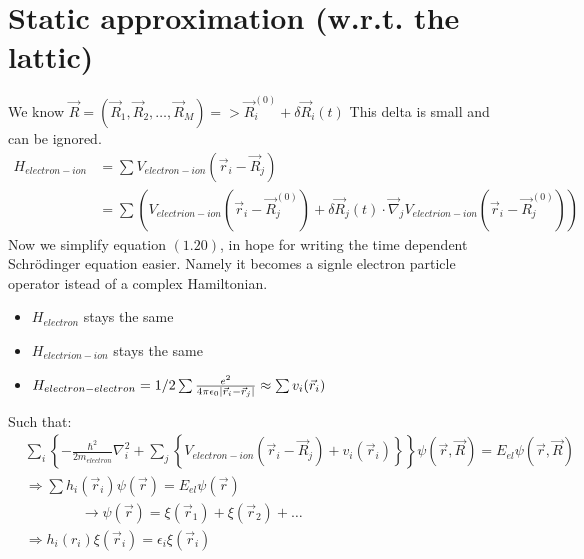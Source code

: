 \documentclass{report}
\begin{document}
\section{Static approximation (w.r.t. the lattic)}
We know $\vec{R} = (\vec{R}_1, \vec{R}_2, \dots, \vec{R}_M) => \vec{R}^{(0)}_i + \delta\vec{R}_i(t)$ This delta is small and can be ignored.
\begin{align}
	H_{electron - ion} & = \sum{V_{electron - ion}(\vec{r}_i - \vec{R}_j)} \\
	& = \sum{(V_{electrion - ion}(\vec{r}_i - \vec{R}^{(0)}_j) + \delta\vec{R}_j(t) \cdot \vec{\nabla}_j V_{electrion - ion}(\vec{r}_i - \vec{R}^{(0)}_j))}
\end{align}
Now we simplify equation $(1.20)$, in hope for writing the time dependent Schrödinger equation easier. Namely it becomes a signle electron particle operator istead of a complex Hamiltonian.
\begin{itemize}
	\setlength\itemsep{0mm}
	\item $H_{electron}$ stays the same
	\item $H_{electrion - ion}$ stays the same
	\item $H_{electron - electron} = 1/2 \sum{\frac{e^2}{4 \pi \epsilon_0 \lvert\vec{r}_i - \vec{r}_j\rvert}} \approx \sum{v_i(\vec{r}_i)}$
\end{itemize}
Such that: 
\begin{align}
	& \sum_{i}^{}{\left\{-\frac{\hbar^2}{2m_{electron}} \nabla_i^2 + \sum_{j}^{}{\left\{V_{electron - ion}(\vec{r}_i- \vec{R}_j) + v_i(\vec{r}_i)\right\}}\right\}}\psi(\vec{r}, \vec{R}) = E_{el}\psi(\vec{r}, \vec{R}) \\
	& \Rightarrow \sum{h_i(\vec{r}_i)}\psi(\vec{r}) = E_{el}\psi(\vec{r}) \\
	& \qquad \qquad \longrightarrow \psi(\vec{r}) = \xi(\vec{r}_1) + \xi(\vec{r}_2) + \dots \\
	& \Rightarrow h_i(r_i)\xi(\vec{r}_i) = \epsilon_i \xi(\vec{r}_i)
\end{align}
\end{document}
